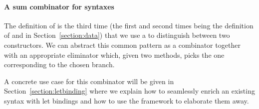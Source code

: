 \paragraph*{A sum combinator for syntaxes}\label{desccomb}

The definition of  is the third time (the first and second
times being the definition of  and  in
Section~\ref{section:data}) that we use a  to distinguish
between two constructors. We can abstract this common pattern as a combinator  together
with an appropriate eliminator  which, given two methods,
picks the one corresponding to the chosen branch.

\begin{center}
\begin{minipage}[t]{0.35\textwidth}
\end{minipage}\hfill
\begin{minipage}[t]{0.55\textwidth}
\end{minipage}
\end{center}



A concrete use case for this combinator will be given in
Section~\ref{section:letbinding}
where we explain how to seamlessly enrich an existing syntax with let bindings
and how to use the \semrec{} framework to elaborate them away.


